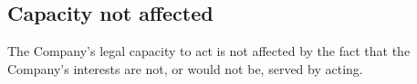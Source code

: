 \subsection{Capacity not affected}

The Company's legal capacity to act is not affected by the fact that the Company's interests are not, or would not be, served by acting. 